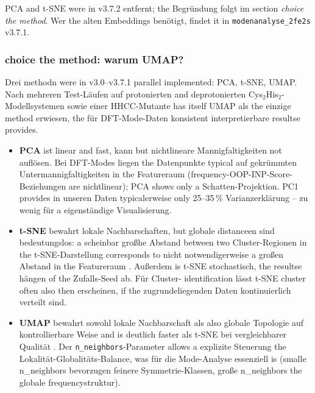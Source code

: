 \documentclass[11pt,a4paper,twoside]{article}
\theoremstyle{remark}
\begin{document}
PCA and t-SNE were in v3.7.2 entfernt; the Begr\"undung folgt im
section \emph{choice the method}. Wer the alten Embeddings
ben\"otigt, findet it in \texttt{modenanalyse\_2fe2s} v3.7.1.

\subsubsection*{choice the method: warum UMAP?}

Drei methodn were in v3.0--v3.7.1 parallel implemented: PCA, t-SNE,
UMAP. Nach mehreren Test-L\"aufen auf protonierten and deprotonierten
Cys$_2$His$_2$-Modellsystemen sowie einer
HHCC-Mutante has itself UMAP als the einzige method erwiesen, the f\"ur
DFT-Mode-Daten konsistent interpretierbare resultse provides.

\begin{itemize}
  \item \textbf{PCA} \cite{Pearson1901,Hotelling1933,Jolliffe2002} ist
        linear and fast, kann but nichtlineare Mannigfaltigkeiten
        not aufl\"osen. Bei DFT-Modes liegen the Datenpunkte typical
        auf gekr\"ummten Untermannigfaltigkeiten in the Featureraum
        (frequency-OOP-INP-Score-Beziehungen are nichtlinear); PCA
        shows only a Schatten-Projektion. PC1 provides in unseren
        Daten typicalerweise only 25--35\,\% Varianzerkl\"arung -- zu
        wenig f\"ur a eigenst\"andige Visualisierung.

  \item \textbf{t-SNE} \cite{vanDerMaaten2008,vanDerMaaten2014} bewahrt
        lokale Nachbarschaften, but globale distanceen sind
        bedeutungslos: a scheinbar gro\ss he Abstand between two
        Cluster-Regionen in the t-SNE-Darstellung corresponds to nicht
        notwendigerweise a gro\ss en Abstand in the Featureraum
        \cite{vanDerMaaten2008}. Au\ss erdem is t-SNE stochastisch,
        the resultse h\"angen of the Zufalls-Seed ab. F\"ur Cluster-
        identification l\"asst t-SNE cluster often also then erscheinen,
        if the zugrundeliegenden Daten kontinuierlich verteilt sind.

  \item \textbf{UMAP} \cite{McInnes2018,Becht2019} bewahrt sowohl
        lokale Nachbarschaft als also globale Topologie auf
        kontrollierbare Weise and is deutlich faster als t-SNE
        bei vergleichbarer Qualit\"at \cite{Becht2019}. Der
        \texttt{n\_neighbors}-Parameter allows a explizite
        Steuerung the Lokalit\"at-Globalit\"ats-Balance, was f\"ur die
        Mode-Analyse essenziell is (smalle n\_neighbors bevorzugen
        feinere Symmetrie-Klassen, gro\ss e n\_neighbors the globale
        frequencystruktur).
\end{itemize}
\end{document}

